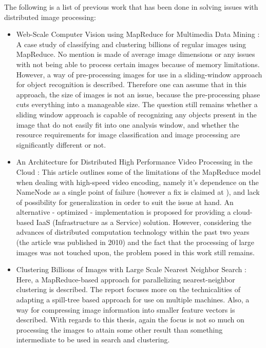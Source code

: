 \documentclass [12pt,a4paper]{report}
\begin{document}
The following is a list of previous work that has been done in solving issues with distributed image processing:

\begin{itemize}
	\item Web-Scale Computer Vision using MapReduce for Multimedia Data Mining \cite{White:2010:WCV:1814245.1814254}: A case study of classifying and clustering billions of regular images using MapReduce. No mention is made of average image dimensions or any issues with not being able to process certain images because of memory limitations. However, a way of pre-processing images for use in a sliding-window approach for object recognition is described. Therefore one can assume that in this approach, the size of images is not an issue, because the pre-processing phase cuts everything into a manageable size. The question still remains whether a sliding window approach is capable of recognizing any objects present in the image that do not easily fit into one analysis window, and whether the resource requirements for image classification and image processing are significantly different or not.
	\item An Architecture for Distributed High Performance Video Processing in the Cloud \cite{Pereira:2010:ADH:1844768.1845374}: This article outlines some of the limitations of the MapReduce model when dealing with high-speed video encoding, namely it's dependence on the NameNode as a single point of failure (however a fix is claimed at \cite{website:facebook_namenode_improvements}), and lack of possibility for generalization in order to suit the issue at hand. An alternative - optimized - implementation is proposed for providing a cloud-based IaaS (Infrastructure as a Service) solution. However, considering the advances of distributed computation technology within the past two years (the article was published in 2010) and the fact that the processing of large images was not touched upon, the problem posed in this work still remains.
	\item Clustering Billions of Images with Large Scale Nearest Neighbor Search \cite{citeulike:2631015}: Here, a MapReduce-based approach for parallelizing nearest-neighbor clustering is described. The report focuses more on the technicalities of adapting a spill-tree based approach for use on multiple machines. Also, a way for compressing image information into smaller feature vectors is described. With regards to this thesis, again the focus is not so much on processing the images to attain some other result than something intermediate to be used in search and clustering.

\end{itemize}
\end{document}
